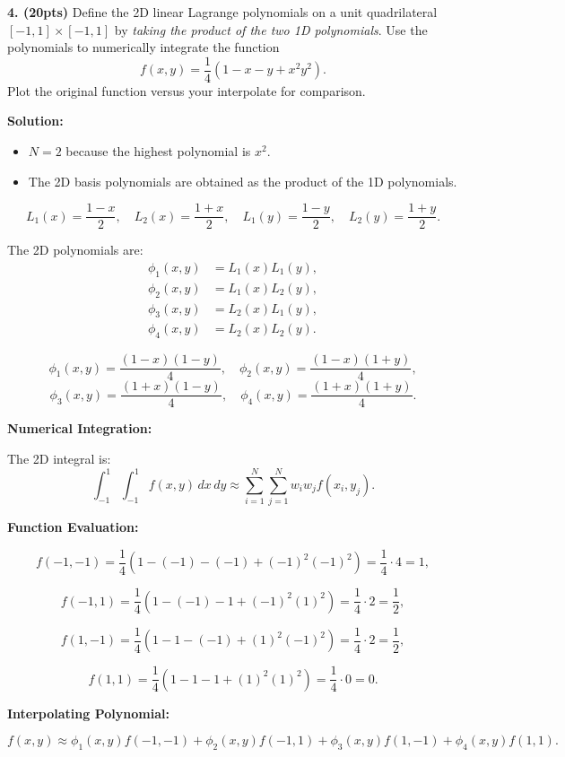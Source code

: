 \documentclass[11pt]{article}
\begin{document}
\textbf{4. (20pts)} Define the 2D linear Lagrange polynomials on a unit quadrilateral \([-1, 1] \times [-1, 1]\) by \textit{taking the product of the two 1D polynomials}. Use the polynomials to numerically integrate the function 
\[
f(x, y) = \frac{1}{4}(1 - x - y + x^2 y^2).
\]
Plot the original function versus your interpolate for comparison.

\textbf{Solution:}

\begin{itemize}
    \item \(N = 2\) because the highest polynomial is \(x^2\).
    \item The 2D basis polynomials are obtained as the product of the 1D polynomials.
\end{itemize}

\[
L_1(x) = \frac{1 - x}{2}, \quad L_2(x) = \frac{1 + x}{2}, \quad L_1(y) = \frac{1 - y}{2}, \quad L_2(y) = \frac{1 + y}{2}.
\]

The 2D polynomials are:
\[
\begin{aligned}
\phi_1(x, y) &= L_1(x) L_1(y), \\
\phi_2(x, y) &= L_1(x) L_2(y), \\
\phi_3(x, y) &= L_2(x) L_1(y), \\
\phi_4(x, y) &= L_2(x) L_2(y).
\end{aligned}
\]

\[
\phi_1(x, y) = \frac{(1 - x)(1 - y)}{4}, \quad \phi_2(x, y) = \frac{(1 - x)(1 + y)}{4},
\]
\[
\phi_3(x, y) = \frac{(1 + x)(1 - y)}{4}, \quad \phi_4(x, y) = \frac{(1 + x)(1 + y)}{4}.
\]

\textbf{Numerical Integration:}

The 2D integral is:
\[
\int_{-1}^1 \int_{-1}^1 f(x, y) \, dx \, dy \approx \sum_{i=1}^N \sum_{j=1}^N w_i w_j f(x_i, y_j).
\]

\textbf{Function Evaluation:}

\[
f(-1, -1) = \frac{1}{4}(1 - (-1) - (-1) + (-1)^2(-1)^2) = \frac{1}{4} \cdot 4 = 1,
\]

\[
f(-1, 1) = \frac{1}{4}(1 - (-1) - 1 + (-1)^2(1)^2) = \frac{1}{4} \cdot 2 = \frac{1}{2},
\]

\[
f(1, -1) = \frac{1}{4}(1 - 1 - (-1) + (1)^2(-1)^2) = \frac{1}{4} \cdot 2 = \frac{1}{2},
\]

\[
f(1, 1) = \frac{1}{4}(1 - 1 - 1 + (1)^2(1)^2) = \frac{1}{4} \cdot 0 = 0.
\]

\textbf{Interpolating Polynomial:}

\[
f(x, y) \approx \phi_1(x, y) f(-1, -1) + \phi_2(x, y) f(-1, 1) + \phi_3(x, y) f(1, -1) + \phi_4(x, y) f(1, 1).
\]
\end{document}
